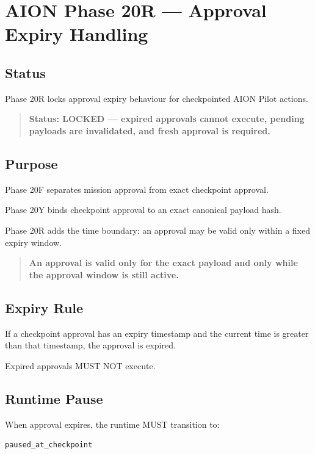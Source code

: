 \section{AION Phase 20R --- Approval Expiry Handling}
\label{sec:aion-phase20r-approval-expiry}

\subsection{Status}

Phase 20R locks approval expiry behaviour for checkpointed AION Pilot actions.

\begin{quote}
\textbf{Status: LOCKED --- expired approvals cannot execute, pending payloads are invalidated, and fresh approval is required.}
\end{quote}

\subsection{Purpose}

Phase 20F separates mission approval from exact checkpoint approval.

Phase 20Y binds checkpoint approval to an exact canonical payload hash.

Phase 20R adds the time boundary: an approval may be valid only within a fixed expiry window.

\begin{quote}
\textbf{An approval is valid only for the exact payload and only while the approval window is still active.}
\end{quote}

\subsection{Expiry Rule}

If a checkpoint approval has an expiry timestamp and the current time is greater than that timestamp, the approval is expired.

Expired approvals MUST NOT execute.

\subsection{Runtime Pause}

When approval expires, the runtime MUST transition to:

\begin{verbatim}
paused_at_checkpoint
\end{verbatim}

